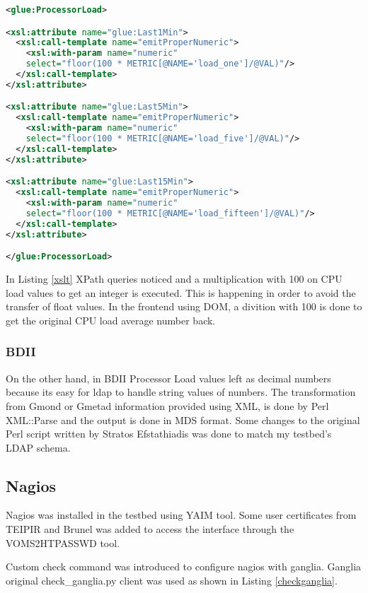 \begin{lstlisting}[language=XML,caption=WSRF XSLT for Ganglia Information Provider,label=xslt]
<glue:ProcessorLoad>

<xsl:attribute name="glue:Last1Min">
  <xsl:call-template name="emitProperNumeric">
    <xsl:with-param name="numeric" 
    select="floor(100 * METRIC[@NAME='load_one']/@VAL)"/>
  </xsl:call-template>
</xsl:attribute>

<xsl:attribute name="glue:Last5Min">
  <xsl:call-template name="emitProperNumeric">
    <xsl:with-param name="numeric" 
    select="floor(100 * METRIC[@NAME='load_five']/@VAL)"/>
  </xsl:call-template>
</xsl:attribute>

<xsl:attribute name="glue:Last15Min">
  <xsl:call-template name="emitProperNumeric">
    <xsl:with-param name="numeric" 
    select="floor(100 * METRIC[@NAME='load_fifteen']/@VAL)"/>
  </xsl:call-template>
</xsl:attribute>

</glue:ProcessorLoad>
\end{lstlisting}

In Listing \ref{xslt} XPath queries noticed and a multiplication with 100 on CPU load values to get an integer is executed. This is happening in order to avoid the transfer of float values. In the frontend using DOM, a divition with 100 is done to get the original CPU load average number back.

\subsubsection{BDII}

On the other hand, in BDII Processor Load values left as decimal numbers because its easy for ldap to handle string values of numbers. The transformation from Gmond or Gmetad information provided using XML, is done by Perl XML::Parse and the output is done in MDS format. Some changes to the original Perl script written by Stratos Efstathiadis was done to match my testbed's LDAP schema.

\subsection{Nagios}

Nagios was installed in the testbed using YAIM tool. Some user certificates from TEIPIR and Brunel was added to access the interface through the VOMS2HTPASSWD tool.

Custom check command was introduced to configure nagios with ganglia. Ganglia original check\_ganglia.py client was used as shown in Listing \ref{checkganglia}.

